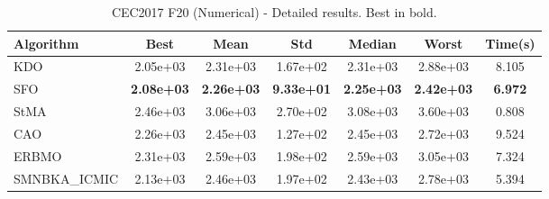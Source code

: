 \begin{table}[H]
\centering\small
\caption{CEC2017 F20 (Numerical) - Detailed results. Best in bold.}
\label{tab:cec2017_F20}
\begin{tabular}{lcccccc}
\toprule
\textbf{Algorithm} & \textbf{Best} & \textbf{Mean} & \textbf{Std} & \textbf{Median} & \textbf{Worst} & \textbf{Time(s)} \\
\midrule
KDO & 2.05e+03 & 2.31e+03 & 1.67e+02 & 2.31e+03 & 2.88e+03 & 8.105 \\
SFO & \textbf{2.08e+03} & \textbf{2.26e+03} & \textbf{9.33e+01} & \textbf{2.25e+03} & \textbf{2.42e+03} & \textbf{6.972} \\
StMA & 2.46e+03 & 3.06e+03 & 2.70e+02 & 3.08e+03 & 3.60e+03 & 0.808 \\
CAO & 2.26e+03 & 2.45e+03 & 1.27e+02 & 2.45e+03 & 2.72e+03 & 9.524 \\
ERBMO & 2.31e+03 & 2.59e+03 & 1.98e+02 & 2.59e+03 & 3.05e+03 & 7.324 \\
SMNBKA_ICMIC & 2.13e+03 & 2.46e+03 & 1.97e+02 & 2.43e+03 & 2.78e+03 & 5.394 \\
\bottomrule
\end{tabular}
\end{table}
